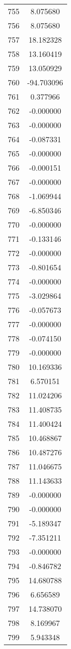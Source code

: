 \documentclass[12pt]{article}
\begin{document}
\begin{longtable}{@{}cc@{}}
755 & 8.075680 \\
756 & 8.075680 \\
757 & 18.182328 \\
758 & 13.160419 \\
759 & 13.050929 \\
760 & -94.703096 \\
761 & 0.377966 \\
762 & -0.000000 \\
763 & -0.000000 \\
764 & -0.087331 \\
765 & -0.000000 \\
766 & -0.000151 \\
767 & -0.000000 \\
768 & -1.069944 \\
769 & -6.850346 \\
770 & -0.000000 \\
771 & -0.133146 \\
772 & -0.000000 \\
773 & -0.801654 \\
774 & -0.000000 \\
775 & -3.029864 \\
776 & -0.057673 \\
777 & -0.000000 \\
778 & -0.074150 \\
779 & -0.000000 \\
780 & 10.169336 \\
781 & 6.570151 \\
782 & 11.024206 \\
783 & 11.408735 \\
784 & 11.400424 \\
785 & 10.468867 \\
786 & 10.487276 \\
787 & 11.046675 \\
788 & 11.143633 \\
789 & -0.000000 \\
790 & -0.000000 \\
791 & -5.189347 \\
792 & -7.351211 \\
793 & -0.000000 \\
794 & -0.846782 \\
795 & 14.680788 \\
796 & 6.656589 \\
797 & 14.738070 \\
798 & 8.169967 \\
799 & 5.943348 \\

\end{longtable}
\end{document}
